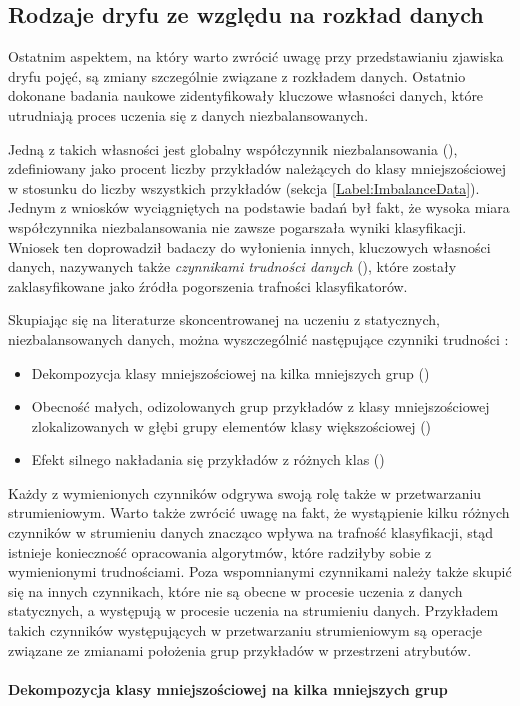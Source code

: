 \subsection{Rodzaje dryfu ze względu na rozkład danych}
\label{Section:DriftDataDistribution}

\noindent Ostatnim aspektem, na który warto zwrócić uwagę przy przedstawianiu zjawiska dryfu pojęć, są zmiany szczególnie związane z rozkładem danych. Ostatnio dokonane badania naukowe zidentyfikowały kluczowe własności danych, które utrudniają proces uczenia się z danych niezbalansowanych.

Jedną z takich własności jest globalny współczynnik niezbalansowania (), zdefiniowany jako procent liczby przykładów należących do klasy mniejszościowej w stosunku do liczby wszystkich przykładów (sekcja \ref{Label:ImbalanceData}). Jednym z wniosków wyciągniętych na podstawie badań był fakt, że wysoka miara współczynnika niezbalansowania nie zawsze pogarszała wyniki klasyfikacji. Wniosek ten doprowadził badaczy do wyłonienia innych, kluczowych własności danych, nazywanych także \textit{czynnikami trudności danych} (), które zostały zaklasyfikowane jako źródła pogorszenia trafności klasyfikatorów.

Skupiając się na literaturze skoncentrowanej na uczeniu z statycznych, niezbalansowanych danych, można wyszczególnić następujące czynniki trudności \cite{Book:DataDistribution}\cite{Article:DataDistribution}:

\begin{itemize}
    \item Dekompozycja klasy mniejszościowej na kilka mniejszych grup ()
    \item Obecność małych, odizolowanych grup przykładów z klasy mniejszościowej zlokalizowanych w głębi grupy elementów klasy większościowej ()
    \item Efekt silnego nakładania się przykładów z różnych klas ()
\end{itemize}

\noindent Każdy z wymienionych czynników odgrywa swoją rolę także w przetwarzaniu strumieniowym. Warto także zwrócić uwagę na fakt, że wystąpienie kilku różnych czynników w strumieniu danych znacząco wpływa na trafność klasyfikacji, stąd istnieje konieczność opracowania algorytmów, które radziłyby sobie z wymienionymi trudnościami. Poza wspomnianymi czynnikami należy także skupić się na innych czynnikach, które nie są obecne w procesie uczenia z danych statycznych, a występują w procesie uczenia na strumieniu danych. Przykładem takich czynników występujących w przetwarzaniu strumieniowym są operacje związane ze zmianami położenia grup przykładów w przestrzeni atrybutów.\\\\
\textbf{Dekompozycja klasy mniejszościowej na kilka mniejszych grup}\\

